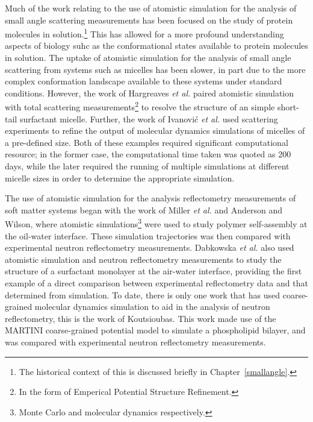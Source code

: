 Much of the work relating to the use of atomistic simulation for the analysis of small angle scattering measurements has been focused on the study of protein molecules in solution.\footnote{The historical context of this is discussed briefly in Chapter~\ref{smallangle}.}
This has allowed for a more profound understanding aspects of biology suhc as the conformational states available to protein molecules in solution.\autocite{bowerman_determining_2017}
The uptake of atomistic simulation for the analysis of small angle scattering from systems such as micelles has been slower, in part due to the more complex conformation landscape available to these systems under standard conditions.
However, the work of Hargreaves \emph{et al.} paired atomistic simulation with total scattering measurements\footnote{In the form of Emperical Potential Structure Refinement.} to resolve the structure of an simple short-tail surfactant micelle.\autocite{hargreaves_atomistic_2011}
Further, the work of Ivanovi\'{c} \emph{et al.} used scattering experiments to refine the output of molecular dynamics simulations of micelles of a pre-defined size.\autocite{ivanovic_temperature-dependent_2018}
Both of these examples required significant computational resource; in the former case, the computational time taken was quoted as 200 days, while the later required the running of multiple simulations at different micelle sizes in order to determine the appropriate simulation.

The use of atomistic simulation for the analysis reflectometry measurements of soft matter systems began with the work of Miller \emph{et al.} and Anderson and Wilson,\autocite{miller_monte_2003,anderson_molecular_2004} where atomistic simulations\footnote{Monte Carlo and molecular dynamics respectively.} were used to study polymer self-assembly at the oil-water interface.
These simulation trajectories was then compared with experimental neutron reflectometry measurements.
Dabkowska \emph{et al.} also used atomistic simulation and neutron reflectometry measurements to study the structure of a surfactant monolayer at the air-water interface, providing the first example of a direct comparison between experimental reflectometry data and that determined from simulation.\autocite{dabkowska_modulation_2014}
To date, there is only one work that has used coarse-grained molecular dynamics simulation to aid in the analysis of neutron reflectometry, this is the work of Koutsioubas.\autocite{koutsioubas_combined_2016}
This work made use of the MARTINI coarse-grained potential model to simulate a phospholipid bilayer, and was compared with experimental neutron reflectometry measurements.
